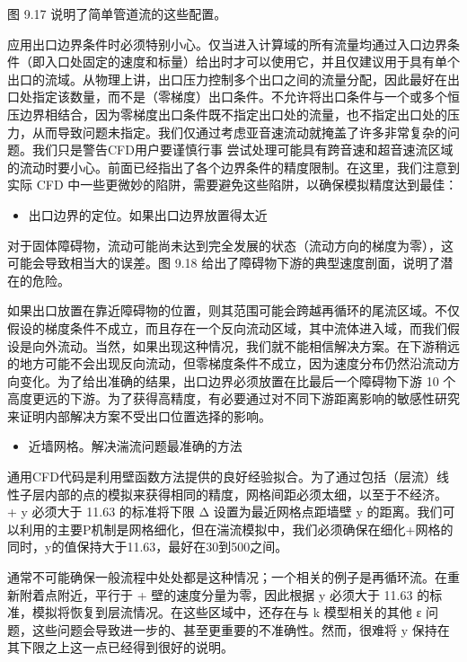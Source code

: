 \documentclass[11pt,a4paper,openany,fontset=none]{ctexbook}
\begin{document}
图 9.17 说明了简单管道流的这些配置。

应用出口边界条件时必须特别小心。仅当进入计算域的所有流量均通过入口边界条件（即入口处固定的速度和标量）给出时才可以使用它，并且仅建议用于具有单个出口的流域。从物理上讲，出口压力控制多个出口之间的流量分配，因此最好在出口处指定该数量，而不是（零梯度）出口条件。不允许将出口条件与一个或多个恒压边界相结合，因为零梯度出口条件既不指定出口处的流量，也不指定出口处的压力，从而导致问题未指定。我们仅通过考虑亚音速流动就掩盖了许多非常复杂的问题。我们只是警告CFD用户要谨慎行事
尝试处理可能具有跨音速和超音速流区域的流动时要小心。前面已经指出了各个边界条件的精度限制。在这里，我们注意到实际 CFD 中一些更微妙的陷阱，需要避免这些陷阱，以确保模拟精度达到最佳：

\begin{itemize}

\item 出口边界的定位。如果出口边界放置得太近

\end{itemize}

对于固体障碍物，流动可能尚未达到完全发展的状态（流动方向的梯度为零），这可能会导致相当大的误差。图 9.18 给出了障碍物下游的典型速度剖面，说明了潜在的危险。

如果出口放置在靠近障碍物的位置，则其范围可能会跨越再循环的尾流区域。不仅假设的梯度条件不成立，而且存在一个反向流动区域，其中流体进入域，而我们假设是向外流动。当然，如果出现这种情况，我们就不能相信解决方案。在下游稍远的地方可能不会出现反向流动，但零梯度条件不成立，因为速度分布仍然沿流动方向变化。为了给出准确的结果，出口边界必须放置在比最后一个障碍物下游 10 个高度更远的下游。为了获得高精度，有必要通过对不同下游距离影响的敏感性研究来证明内部解决方案不受出口位置选择的影响。

\begin{itemize}

\item 近墙网格。解决湍流问题最准确的方法

\end{itemize}

通用CFD代码是利用壁函数方法提供的良好经验拟合。为了通过包括（层流）线性子层内部的点的模拟来获得相同的精度，网格间距必须太细，以至于不经济。 + y 必须大于 11.63 的标准将下限 Δ 设置为最近网格点距墙壁 y 的距离。我们可以利用的主要P机制是网格细化，但在湍流模拟中，我们必须确保在细化+网格的同时，y的值保持大于11.63，最好在30到500之间。

通常不可能确保一般流程中处处都是这种情况；一个相关的例子是再循环流。在重新附着点附近，平行于 + 壁的速度分量为零，因此根据 y 必须大于 11.63 的标准，模拟将恢复到层流情况。在这些区域中，还存在与 k 模型相关的其他 ε 问题，这些问题会导致进一步的、甚至更重要的不准确性。然而，很难将 y 保持在其下限之上这一点已经得到很好的说明。
\end{document}
